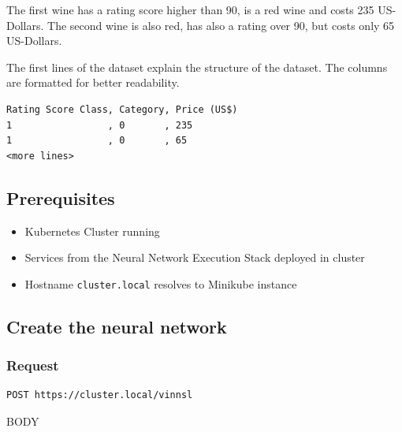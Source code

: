 The first wine has a rating score higher than 90, is a red wine and
costs 235 US-Dollars. The second wine is also red, has also a rating
over 90, but costs only 65 US-Dollars.

The first lines of the dataset explain the structure of the dataset. The
columns are formatted for better readability.

\begin{verbatim}
Rating Score Class, Category, Price (US$)
1                 , 0       , 235
1                 , 0       , 65
<more lines>
\end{verbatim}

\subsection{Prerequisites}\label{prerequisites-5}

\begin{itemize}
\tightlist
\item
  Kubernetes Cluster running
\item
  Services from the Neural Network Execution Stack deployed in cluster
\item
  Hostname \texttt{cluster.local} resolves to Minikube instance
\end{itemize}

\subsection{Create the neural
network}\label{create-the-neural-network-1}

\subsubsection{Request}\label{request-3}

\begin{verbatim}
POST https://cluster.local/vinnsl
\end{verbatim}

BODY

